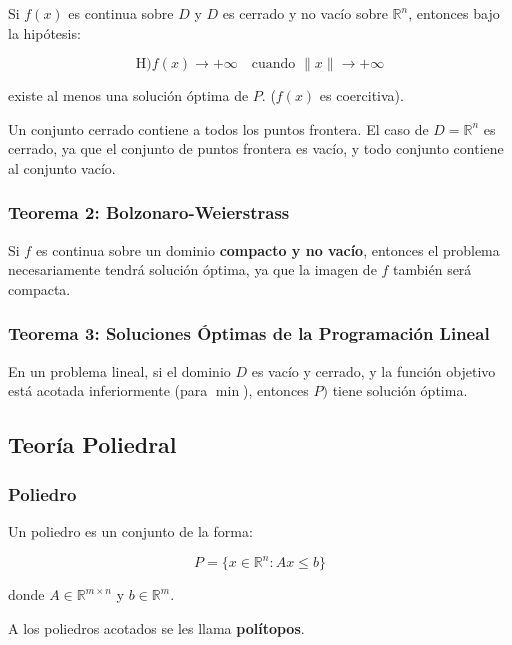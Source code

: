 \documentclass{article}
\begin{document}
Si $f(x)$ es continua sobre $D$ y $D$ es cerrado y no vacío sobre $\mathbb{R}^n$, entonces bajo la hipótesis:

\begin{equation*}
    \text{H)} f(x) \rightarrow +\infty \quad \text{cuando } \lVert x \rVert \rightarrow +\infty
\end{equation*}

existe al menos una solución óptima de $P$. ($f(x)$ es coercitiva).

Un conjunto cerrado contiene a todos los puntos frontera. El caso de $D=\mathbb{R}^n$ es cerrado, ya que el conjunto de puntos frontera es vacío, y todo conjunto contiene al conjunto vacío.

\subsubsection{Teorema 2: Bolzonaro-Weierstrass}

Si $f$ es continua sobre un dominio \textbf{compacto y no vacío}, entonces el problema necesariamente tendrá solución óptima, ya que la imagen de $f$ también será compacta.

\subsubsection{Teorema 3: Soluciones Óptimas de la Programación Lineal}

En un problema lineal, si el dominio $D$ es vacío y cerrado, y la función objetivo está acotada inferiormente (para $\min$), entonces $P)$ tiene solución óptima.

\subsection{Teoría Poliedral}

\subsubsection{Poliedro}

Un poliedro es un conjunto de la forma:

\begin{equation*}
    P = \{x \in \mathbb{R}^n: Ax \leq b\}
\end{equation*}

donde $A \in \mathbb{R}^{m \times n}$ y $b \in \mathbb{R}^m$.

A los poliedros acotados se les llama \textbf{polítopos}.
\end{document}
